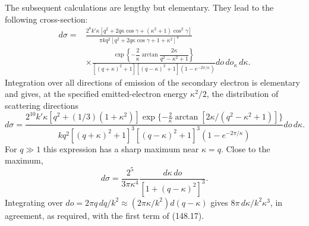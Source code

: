 The subsequent calculations are lengthy but elementary.  They lead to the
following cross-section:
\[
\begin{split}
 d\sigma={}&\frac{2^8k'\kappa
 [q^2+2q\kappa\cos\gamma+(\kappa^2+1)\cos^2\gamma]}
 {\pi kq^2[q^2+2q\kappa\cos\gamma+1+\kappa^2]^4}\\
 &\times\frac{\exp\!\left\{-\dfrac2\kappa
 \arctan\dfrac{2\kappa}{q^2-\kappa^2+1}\right\}}
 {[(q+\kappa)^2+1][(q-\kappa)^2+1](1-e^{-2\pi/\kappa})}
 do\,do_{\kappa}\,d\kappa.
\end{split}
\]
Integration over all directions of emission of the secondary electron is
elementary and gives, at the specified emitted-electron energy $\kappa^2/2$,
the distribution of scattering directions
\[
 d\sigma=\frac{2^{10}k'\kappa[q^2+(1/3)(1+\kappa^2)]
 \exp\{-\frac2\kappa\arctan[2\kappa/(q^2-\kappa^2+1)]\}}
 {kq^2[(q+\kappa)^2+1]^3[(q-\kappa)^2+1]^3(1-e^{-2\pi/\kappa})}
 do\,d\kappa.
\]
For $q\gg1$ this expression has a sharp maximum near $\kappa=q$.  Close to
the maximum,
\[
 d\sigma=\frac{2^5}{3\pi\kappa^4}\frac{d\kappa\,do}{[1+(q-\kappa)^2]^3}.
\]
Integrating over
$do=2\pi q\,dq/k^2\approx(2\pi\kappa/k^2)d(q-\kappa)$ gives
$8\pi\,d\kappa/k^2\kappa^3$, in agreement, as required, with the first term
of (148.17).
